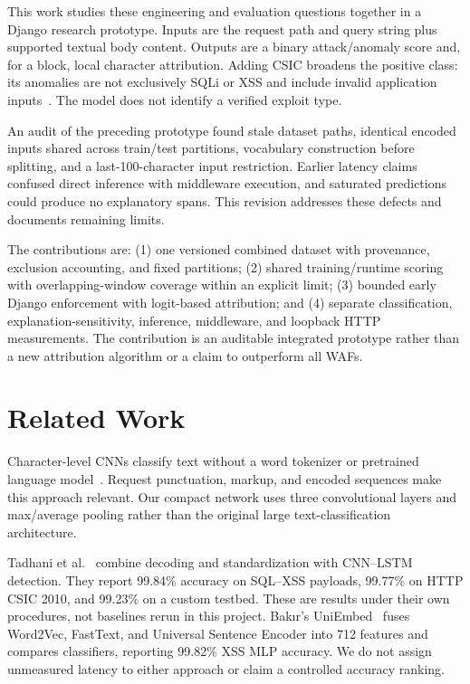\documentclass[conference]{IEEEtran}
\begin{document}
This work studies these engineering and evaluation questions together in a Django research prototype. Inputs are the request path and query string plus supported textual body content. Outputs are a binary attack/anomaly score and, for a block, local character attribution. Adding CSIC broadens the positive class: its anomalies are not exclusively SQLi or XSS and include invalid application inputs~\cite{csic}. The model does not identify a verified exploit type.

An audit of the preceding prototype found stale dataset paths, identical encoded inputs shared across train/test partitions, vocabulary construction before splitting, and a last-100-character input restriction. Earlier latency claims confused direct inference with middleware execution, and saturated predictions could produce no explanatory spans. This revision addresses these defects and documents remaining limits.

The contributions are: (1) one versioned combined dataset with provenance, exclusion accounting, and fixed partitions; (2) shared training/runtime scoring with overlapping-window coverage within an explicit limit; (3) bounded early Django enforcement with logit-based attribution; and (4) separate classification, explanation-sensitivity, inference, middleware, and loopback HTTP measurements. The contribution is an auditable integrated prototype rather than a new attribution algorithm or a claim to outperform all WAFs.

\section{Related Work}
Character-level CNNs classify text without a word tokenizer or pretrained language model~\cite{charcnn}. Request punctuation, markup, and encoded sequences make this approach relevant. Our compact network uses three convolutional layers and max/average pooling rather than the original large text-classification architecture.

Tadhani et al.~\cite{tadhani} combine decoding and standardization with CNN--LSTM detection. They report 99.84\% accuracy on SQL--XSS payloads, 99.77\% on HTTP CSIC 2010, and 99.23\% on a custom testbed. These are results under their own procedures, not baselines rerun in this project. Bak{\i}r's UniEmbed~\cite{uniembed} fuses Word2Vec, FastText, and Universal Sentence Encoder into 712 features and compares classifiers, reporting 99.82\% XSS MLP accuracy. We do not assign unmeasured latency to either approach or claim a controlled accuracy ranking.
\end{document}
